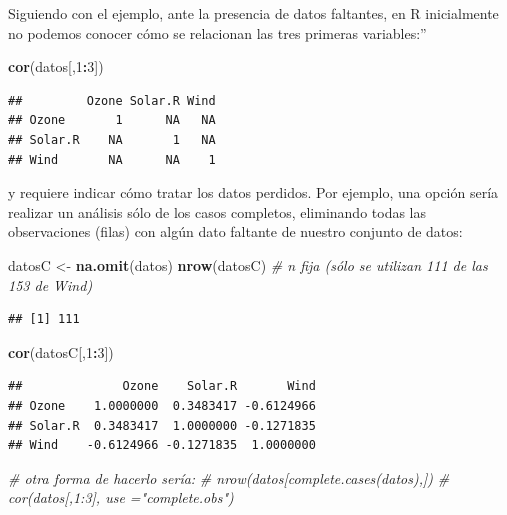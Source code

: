 \documentclass[
]{book}
\newenvironment{Shaded}{\begin{snugshade}}{\end{snugshade}}
\newcommand{\CommentTok}[1]{\textcolor[rgb]{0.56,0.35,0.01}{\textit{#1}}}
\newcommand{\DecValTok}[1]{\textcolor[rgb]{0.00,0.00,0.81}{#1}}
\newcommand{\FunctionTok}[1]{\textcolor[rgb]{0.13,0.29,0.53}{\textbf{#1}}}
\newcommand{\NormalTok}[1]{#1}
\newcommand{\OtherTok}[1]{\textcolor[rgb]{0.56,0.35,0.01}{#1}}
\newcommand{\SpecialCharTok}[1]{\textcolor[rgb]{0.81,0.36,0.00}{\textbf{#1}}}
\begin{document}
Siguiendo con el ejemplo, ante la presencia de datos faltantes, en R inicialmente no podemos conocer cómo se relacionan las tres primeras variables:''

\begin{Shaded}
\begin{Highlighting}[]
\FunctionTok{cor}\NormalTok{(datos[,}\DecValTok{1}\SpecialCharTok{:}\DecValTok{3}\NormalTok{])}
\end{Highlighting}
\end{Shaded}

\begin{verbatim}
##         Ozone Solar.R Wind
## Ozone       1      NA   NA
## Solar.R    NA       1   NA
## Wind       NA      NA    1
\end{verbatim}

y requiere indicar cómo tratar los datos perdidos. Por ejemplo,
una opción sería realizar un análisis sólo de los casos completos, eliminando todas las observaciones (filas) con algún dato faltante de nuestro conjunto de datos:

\begin{Shaded}
\begin{Highlighting}[]
\NormalTok{datosC }\OtherTok{\textless{}{-}} \FunctionTok{na.omit}\NormalTok{(datos)}
\FunctionTok{nrow}\NormalTok{(datosC) }\CommentTok{\# n fija (sólo se utilizan 111 de las 153 de Wind)}
\end{Highlighting}
\end{Shaded}

\begin{verbatim}
## [1] 111
\end{verbatim}

\begin{Shaded}
\begin{Highlighting}[]
\FunctionTok{cor}\NormalTok{(datosC[,}\DecValTok{1}\SpecialCharTok{:}\DecValTok{3}\NormalTok{])}
\end{Highlighting}
\end{Shaded}

\begin{verbatim}
##              Ozone    Solar.R       Wind
## Ozone    1.0000000  0.3483417 -0.6124966
## Solar.R  0.3483417  1.0000000 -0.1271835
## Wind    -0.6124966 -0.1271835  1.0000000
\end{verbatim}

\begin{Shaded}
\begin{Highlighting}[]
\CommentTok{\# otra forma de hacerlo sería:}
\CommentTok{\# nrow(datos[complete.cases(datos),]) }
\CommentTok{\# cor(datos[,1:3], use ="complete.obs") }
\end{Highlighting}
\end{Shaded}
\end{document}
